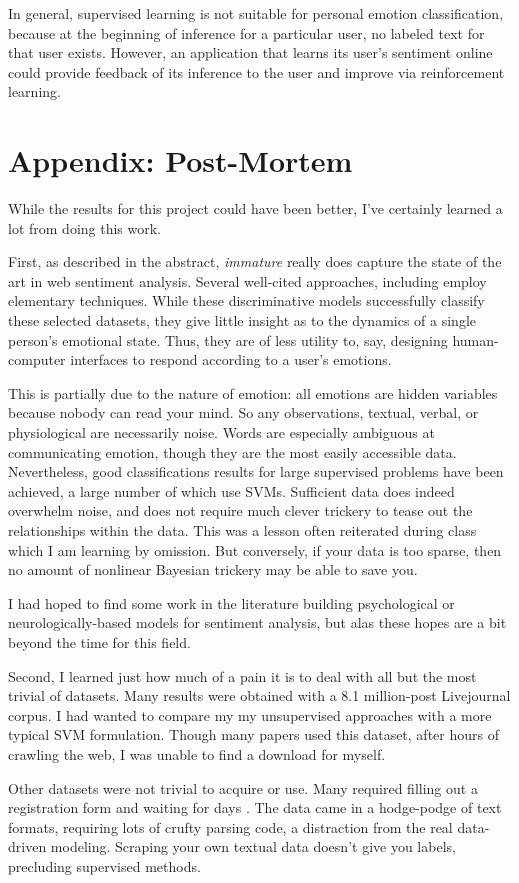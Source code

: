 \documentclass{article}
\begin{document}
In general, supervised learning is not suitable for personal emotion
classification, because at the beginning of inference for a particular
user, no labeled text for that user exists. However, an application
that learns its user's sentiment online could provide feedback of
its inference to the user and improve via reinforcement learning.

\section*{Appendix: Post-Mortem}
While the results for this project could have been better, I've
certainly learned a lot from doing this work.

First, as described in the abstract, \emph{immature} really does
capture the state of the art in web sentiment analysis. Several
well-cited approaches, including \citep{mishne06, alm08, sood09}
employ elementary techniques. While these discriminative models
successfully classify these selected datasets, they give little
insight as to the dynamics of a single person's emotional state.
Thus, they are of less utility to, say, designing human-computer
interfaces to respond according to a user's emotions.

This is partially due to the nature of emotion: all emotions
are hidden variables because nobody can read your mind. So any
observations, textual, verbal, or physiological are necessarily
noise. Words are especially ambiguous at communicating emotion,
though they are the most easily accessible data. Nevertheless, good
classifications results for large supervised problems have been
achieved, a large number of which use SVMs. Sufficient data does
indeed overwhelm noise, and does not require much clever trickery
to tease out the relationships within the data. This was a lesson
often reiterated during class which I am learning by omission. But
conversely, if your data is too sparse, then no amount of nonlinear
Bayesian trickery may be able to save you.

I had hoped to find some work in the literature building psychological
or neurologically-based models for sentiment analysis, but alas
these hopes are a bit beyond the time for this field.

Second, I learned just how much of a pain it is to deal with all
but the most trivial of datasets. Many results were obtained with
a 8.1 million-post Livejournal corpus. I had wanted to compare my
my unsupervised approaches with a more typical SVM formulation.
Though many papers used this dataset, after hours of crawling the
web, I was unable to find a download for myself.

Other datasets were not trivial to acquire or use. Many required
filling out a registration form and waiting for days \citep{baccianella10}.
The data came in a hodge-podge of text formats, requiring lots of
crufty parsing code, a distraction from the real data-driven modeling.
Scraping your own textual data doesn't give you labels, precluding
supervised methods.

\begin{small}

 
\end{small}
\end{document}
